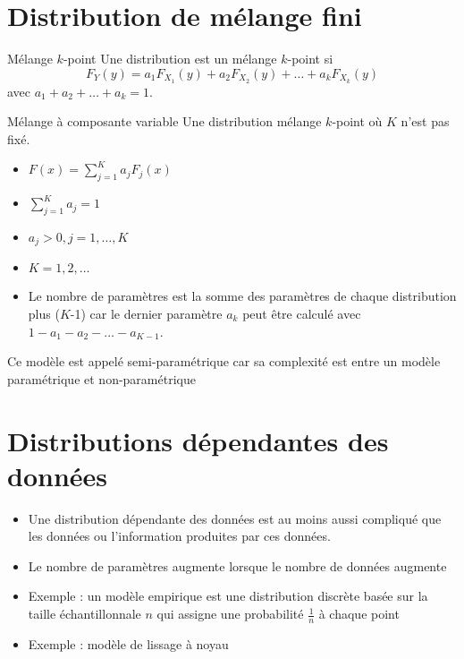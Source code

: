 \section{Distribution de mélange fini}

\begin{definition}{Mélange $k$-point}{}
	Une distribution est un mélange $k$-point si 
	$$F_Y(y) = a_1 F_{X_1}(y) + a_2 F_{X_2}(y) + \dots + a_k F_{X_k}(y)$$
	avec $a_1 + a_2 + \dots + a_k = 1.$
\end{definition}

\begin{definition}{Mélange à composante variable}{}
	Une distribution mélange $k$-point où $K$ n'est pas fixé. 
	\begin{itemize}
		\item $\displaystyle F(x) = \sum_{j = 1}^{K}a_j F_j(x)$
		\item $\displaystyle \sum_{j = 1}^{K}a_j = 1$
		\item $\displaystyle a_j > 0, j = 1, \dots, K$
		\item $\displaystyle K = 1, 2, \dots$
		\item Le nombre de paramètres est la somme des paramètres de chaque distribution plus ($K$-1) car le dernier paramètre $a_k$ peut être calculé avec $1 - a_1 - a_2 - \dots - a_{K-1}$.
	\end{itemize}
	Ce modèle est appelé semi-paramétrique car sa complexité est entre un modèle paramétrique et non-paramétrique
\end{definition}

\section{Distributions dépendantes des données}

\begin{itemize}
	\item Une distribution dépendante des données est au moins aussi compliqué que les données ou l'information produites par ces données. 
	\item Le nombre de paramètres augmente lorsque le nombre de données augmente
	\item Exemple : un modèle empirique est une distribution discrète basée sur la taille échantillonnale $n$ qui assigne une probabilité $\frac{1}{n}$ à chaque point
	\item Exemple : modèle de lissage à noyau
\end{itemize}







